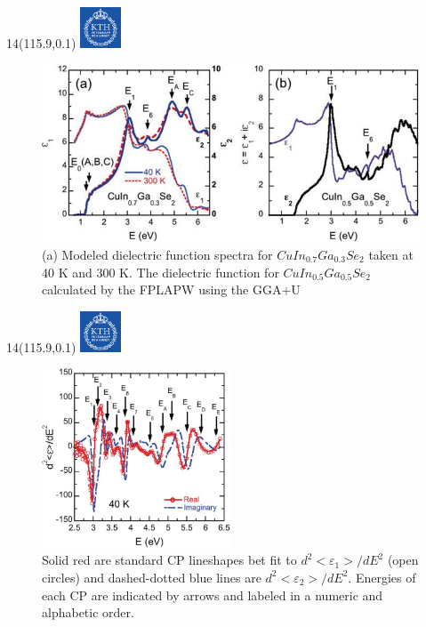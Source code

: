 \documentclass[]{beamer}
\newcommand{\MyLogo}{%
\begin{textblock}{14}(115.9,0.1)
  \includegraphics[width=1.22cm]{kth_rgb}
 \end{textblock}
}
\begin{document}
\begin{frame}
\MyLogo
\begin{figure}[H]
    \begin{center}
            \includegraphics[width=1\textwidth,clip]{seminar/dielectric_function.jpg}
     \end{center}
    \caption{(a) Modeled dielectric function spectra for $CuIn_{0.7}Ga_{0.3}Se_2$ taken at 40 K and 300 K. The dielectric function for $CuIn_{0.5}Ga_{0.5}Se_{2}$ calculated by the FPLAPW using the GGA+U}
\end{figure}
\end{frame}

\begin{frame}
\MyLogo
\begin{figure}[H]
    \begin{center}
            \includegraphics[width=0.5\textwidth,clip]{seminar/CP.jpg}
     \end{center}
    \caption{ Solid red are standard CP lineshapes bet fit to $d^2<\varepsilon_1>/dE^2$ (open circles) and dashed-dotted blue lines are  $d^2<\varepsilon_2>/dE^2$. Energies of each CP are indicated by arrows and labeled in a numeric and alphabetic order.}
\end{figure}
\end{frame}
\end{document}
